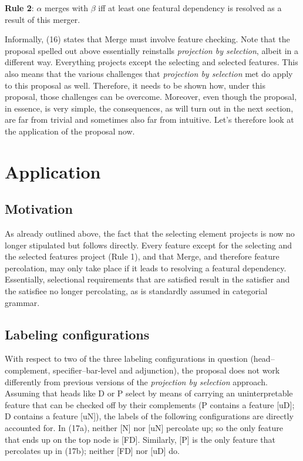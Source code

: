 \documentclass[output=paper
,modfonts
,nonflat]{langsci/langscibook}
\begin{document}
\begin{exe}
\ex \textbf{Rule 2}: $\alpha$ merges with $\beta$ iff at least one featural dependency is resolved as a result of this merger.
\end{exe}
Informally, (16) states that Merge must involve feature checking. Note that the proposal spelled out above essentially reinstalls \textit{projection by selection}, albeit in a different way. Everything projects except the selecting and selected features. This also means that the various challenges that \textit{projection by selection} met do apply to this proposal as well. Therefore, it needs to be shown how, under this proposal, those challenges can be overcome. Moreover, even though the proposal, in essence, is very simple, the consequences, as will turn out in the next section, are far from trivial and sometimes also far from intuitive. Let’s therefore look at the application of the proposal now.

\section{Application}
\subsection{Motivation}
As already outlined above, the fact that the selecting element projects is now no longer stipulated but follows directly. Every feature except for the selecting and the selected features project (Rule 1), and that Merge, and therefore feature percolation, may only take place if it leads to resolving a featural dependency. Essentially, selectional requirements that are satisfied result in the satisfier and the satisfiee no longer percolating, as is standardly assumed in categorial grammar. 

\subsection{Labeling configurations} 
With respect to two of the three labeling configurations in question (head–complement, specifier–bar-level and adjunction), the proposal does not work differently from previous versions of the \textit{projection by selection} approach. Assuming that heads like D or P select by means of carrying an uninterpretable feature that can be checked off by their complements (P contains a feature [uD]; D contains a feature [uN]), the labels of the following configurations are directly accounted for. In (17a), neither [N] nor [uN] percolate up; so the only feature that ends up on the top node is [FD]. Similarly, [P] is the only feature that percolates up in (17b); neither [FD] nor [uD] do.
\end{document}
